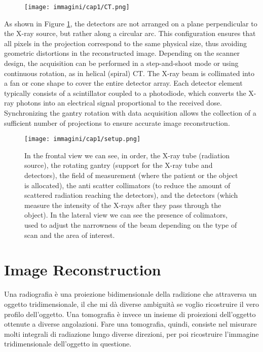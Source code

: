 \begin{figure}[ht]
    \centering
    \texttt{[image: immagini/cap1/CT.png]} 
    \caption{} 
    \label{fig:tomografia}
\end{figure}

As shown in Figure \ref{fig:tomografia}, the detectors are not arranged on a plane perpendicular to the X-ray source, but rather along a circular arc. This configuration ensures that all pixels in the projection correspond to the same physical size, thus avoiding geometric distortions in the reconstructed image.
Depending on the scanner design, the acquisition can be performed in a step-and-shoot mode or using continuous rotation, as in helical (spiral) CT. The X-ray beam is collimated into a fan or cone shape to cover the entire detector array. Each detector element typically consists of a scintillator coupled to a photodiode, which converts the X-ray photons into an electrical signal proportional to the received dose. Synchronizing the gantry rotation with data acquisition allows the collection of a sufficient number of projections to ensure accurate image reconstruction.
\begin{figure}[!ht]
    \centering
    \texttt{[image: immagini/cap1/setup.png]} 
    \caption{In the frontal view we can see, in order, the X-ray tube (radiation source), the rotating gantry (support for the X-ray tube and detectors), the field of measurement (where the patient or the object is allocated), the anti scatter collimators (to reduce the amount of scattered radiation reaching the detectors), and the detectors (which measure the intensity of the X-rays after they pass through the object). In the lateral view we can see the presence of colimators, used to adjust the narrowness of the beam depending on the type of scan and the area of interest.} 
    \label{fig:CT_detector}
\end{figure}

\section{Image Reconstruction}
Una radiografia è una proiezione bidimensionale della radizione che attraversa un oggetto tridimensionale, il che mi dà diverse ambiguità se voglio ricostruire il vero profilo dell'oggetto.
Una tomografia è invece un insieme di proiezioni dell'oggetto ottenute a diverse angolazioni.
Fare una tomografia, quindi, consiste nel misurare molti integrali di radiazione lungo diverse direzioni, per poi ricostruire l'immagine tridimensionale dell'oggetto in questione.

